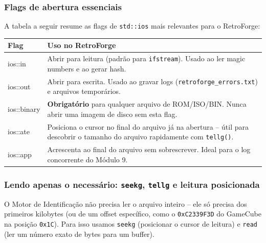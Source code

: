 \subsubsection{Flags de abertura essenciais}

A tabela a seguir resume as flags de \texttt{std::ios} mais relevantes para o RetroForge:

\begin{center}
\begin{tabular}{|>{\ttfamily}l|p{9cm}|}
\hline
\textbf{Flag} & \textbf{Uso no RetroForge} \\
\hline
ios::in & Abrir para leitura (padrão para \texttt{ifstream}). Usado ao ler magic numbers e ao gerar hash. \\
\hline
ios::out & Abrir para escrita. Usado ao gravar logs (\texttt{retroforge\_errors.txt}) e arquivos temporários. \\
\hline
ios::binary & \textbf{Obrigatório} para qualquer arquivo de ROM/ISO/BIN. Nunca abrir uma imagem de disco sem esta flag. \\
\hline
ios::ate & Posiciona o cursor no final do arquivo já na abertura -- útil para descobrir o tamanho do arquivo rapidamente com \texttt{tellg()}. \\
\hline
ios::app & Acrescenta ao final do arquivo sem sobrescrever. Ideal para o log concorrente do Módulo 9. \\
\hline
\end{tabular}
\end{center}

\subsubsection{Lendo apenas o necessário: \texttt{seekg}, \texttt{tellg} e leitura posicionada}

O Motor de Identificação não precisa ler o arquivo inteiro -- ele só precisa dos primeiros kilobytes (ou de um offset específico, como o \texttt{0xC2339F3D} do GameCube na posição \texttt{0x1C}). Para isso usamos \texttt{seekg} (posicionar o cursor de leitura) e \texttt{read} (ler um número exato de bytes para um buffer).

